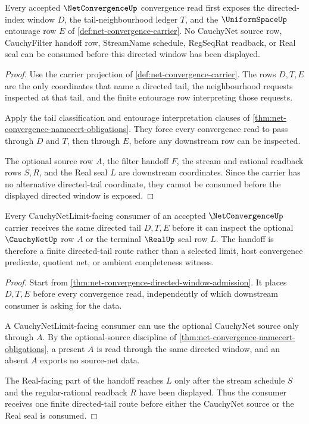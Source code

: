 \begin{theorem}
\label{thm:net-convergence-directed-window-admission}
Every accepted $\NetConvergenceUp$ convergence read first exposes the directed-index window $D$, the tail-neighbourhood ledger $T$, and the $\UniformSpaceUp$ entourage row $E$ of \autoref{def:net-convergence-carrier}. No CauchyNet source row, CauchyFilter handoff row, StreamName schedule, RegSeqRat readback, or Real seal can be consumed before this directed window has been displayed.
\end{theorem}
\begin{proof}
Use the carrier projection of \autoref{def:net-convergence-carrier}. The rows $D,T,E$ are the only coordinates that name a directed tail, the neighbourhood requests inspected at that tail, and the finite entourage row interpreting those requests.

Apply the tail classification and entourage interpretation clauses of \autoref{thm:net-convergence-namecert-obligations}. They force every convergence read to pass through $D$ and $T$, then through $E$, before any downstream row can be inspected.

The optional source row $A$, the filter handoff $F$, the stream and rational readback rows $S,R$, and the Real seal $L$ are downstream coordinates. Since the carrier has no alternative directed-tail coordinate, they cannot be consumed before the displayed directed window is exposed.
\end{proof}

\begin{theorem}
\label{thm:net-convergence-cauchy-net-limit-handoff}
Every CauchyNetLimit-facing consumer of an accepted $\NetConvergenceUp$ carrier receives the same directed tail $D,T,E$ before it can inspect the optional $\CauchyNetUp$ row $A$ or the terminal $\RealUp$ seal row $L$. The handoff is therefore a finite directed-tail route rather than a selected limit, host convergence predicate, quotient net, or ambient completeness witness.
\end{theorem}
\begin{proof}
Start from \autoref{thm:net-convergence-directed-window-admission}. It places $D,T,E$ before every convergence read, independently of which downstream consumer is asking for the data.

A CauchyNetLimit-facing consumer can use the optional CauchyNet source only through $A$. By the optional-source discipline of \autoref{thm:net-convergence-namecert-obligations}, a present $A$ is read through the same directed window, and an absent $A$ exports no source-net data.

The Real-facing part of the handoff reaches $L$ only after the stream schedule $S$ and the regular-rational readback $R$ have been displayed. Thus the consumer receives one finite directed-tail route before either the CauchyNet source or the Real seal is consumed.
\end{proof}

